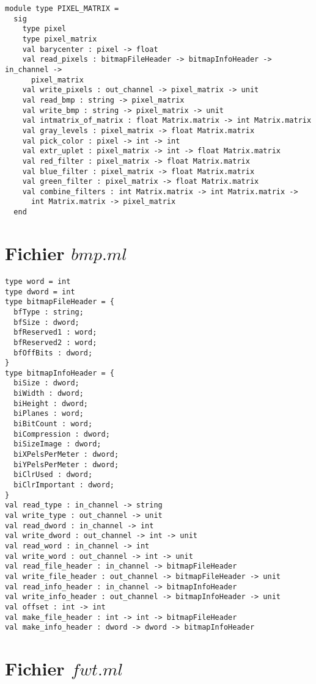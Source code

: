 \documentclass[a4paper,10pt]{article}
\begin{document}
\newpage

    \begin{verbatim}
module type PIXEL_MATRIX =
  sig
    type pixel
    type pixel_matrix
    val barycenter : pixel -> float
    val read_pixels : bitmapFileHeader -> bitmapInfoHeader -> in_channel -> 
      pixel_matrix
    val write_pixels : out_channel -> pixel_matrix -> unit
    val read_bmp : string -> pixel_matrix
    val write_bmp : string -> pixel_matrix -> unit
    val intmatrix_of_matrix : float Matrix.matrix -> int Matrix.matrix
    val gray_levels : pixel_matrix -> float Matrix.matrix
    val pick_color : pixel -> int -> int
    val extr_uplet : pixel_matrix -> int -> float Matrix.matrix
    val red_filter : pixel_matrix -> float Matrix.matrix
    val blue_filter : pixel_matrix -> float Matrix.matrix
    val green_filter : pixel_matrix -> float Matrix.matrix
    val combine_filters : int Matrix.matrix -> int Matrix.matrix -> 
      int Matrix.matrix -> pixel_matrix
  end
    \end{verbatim}
    
  \section*{Fichier $bmp.ml$}
  
    \begin{verbatim}
type word = int
type dword = int
type bitmapFileHeader = {
  bfType : string;
  bfSize : dword;
  bfReserved1 : word;
  bfReserved2 : word;
  bfOffBits : dword;
}
type bitmapInfoHeader = {
  biSize : dword;
  biWidth : dword;
  biHeight : dword;
  biPlanes : word;
  biBitCount : word;
  biCompression : dword;
  biSizeImage : dword;
  biXPelsPerMeter : dword;
  biYPelsPerMeter : dword;
  biClrUsed : dword;
  biClrImportant : dword;
}
val read_type : in_channel -> string
val write_type : out_channel -> unit
val read_dword : in_channel -> int
val write_dword : out_channel -> int -> unit
val read_word : in_channel -> int
val write_word : out_channel -> int -> unit
val read_file_header : in_channel -> bitmapFileHeader
val write_file_header : out_channel -> bitmapFileHeader -> unit
val read_info_header : in_channel -> bitmapInfoHeader
val write_info_header : out_channel -> bitmapInfoHeader -> unit
val offset : int -> int
val make_file_header : int -> int -> bitmapFileHeader
val make_info_header : dword -> dword -> bitmapInfoHeader
    \end{verbatim}
    
\newpage

  \section*{Fichier $fwt.ml$}
  
\end{document}
